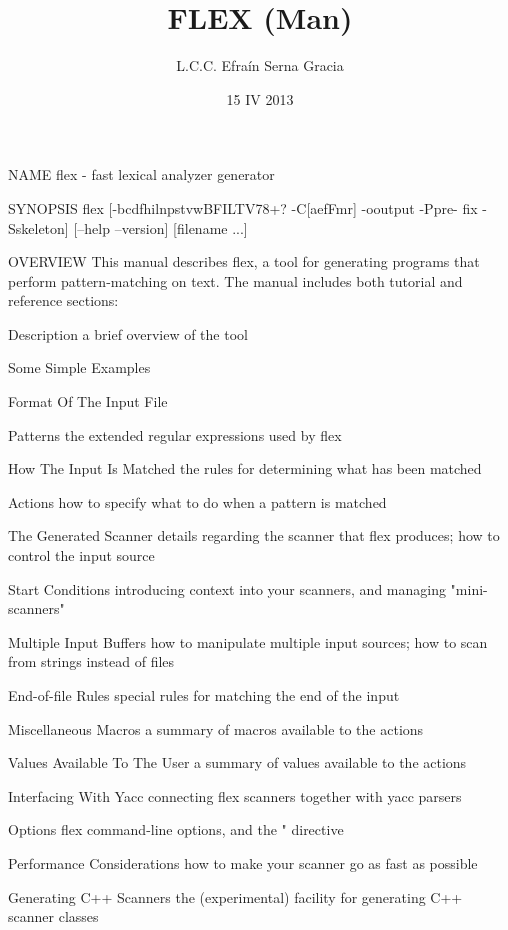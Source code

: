 \documentclass[12pt,spanish,twocolumn,lettersize]{article}
\title{FLEX (Man)}
\author{L.C.C. Efra\'in Serna Gracia}
\date{15 IV 2013}
\begin{document}
\maketitle

NAME
       flex - fast lexical analyzer generator

SYNOPSIS
       flex  [-bcdfhilnpstvwBFILTV78+? -C[aefFmr] -ooutput -Ppre-
       fix -Sskeleton] [--help --version] [filename ...]

OVERVIEW
       This manual describes flex, a tool for generating programs that perform pattern-matching on text. The manual includes both tutorial and reference sections:

	   Description
	       a brief overview of the tool

	   Some Simple Examples

	   Format Of The Input File

	   Patterns
	       the extended regular expressions used by flex

	   How The Input Is Matched
	       the rules for determining what has been matched

	   Actions
	       how to specify what to do when a pattern is matched

	   The Generated Scanner
	       details regarding the scanner that flex produces; how to control the input source

	   Start Conditions
	       introducing context into your scanners, and managing "mini-scanners"

	   Multiple Input Buffers
	       how to manipulate multiple input sources; how to scan from strings instead of files

	   End-of-file Rules
	       special rules for matching the end of the input

	   Miscellaneous Macros
	       a summary of macros available to the actions

	   Values Available To The User
	       a summary of values available to the actions

	   Interfacing With Yacc
	       connecting flex scanners together with yacc parsers

	   Options
	       flex command-line options, and the "%
	       directive

	   Performance Considerations
	       how to make your scanner go as fast as possible

	   Generating C++ Scanners
	       the (experimental) facility for generating C++ scanner classes
\end{document}
